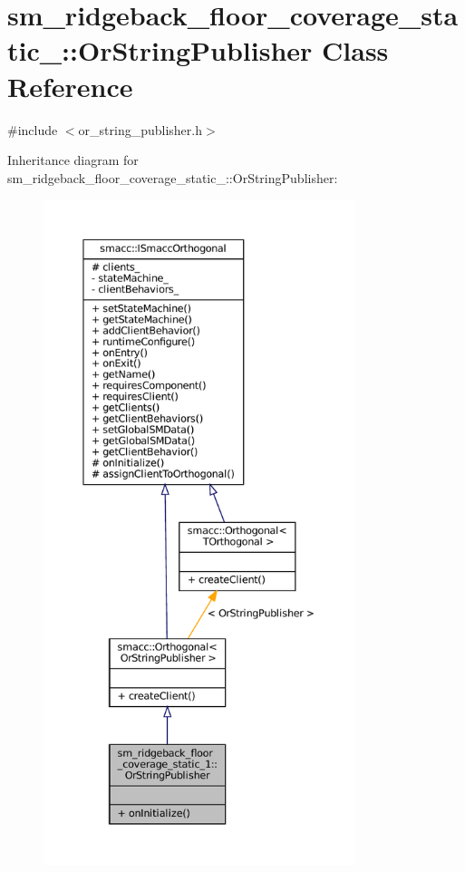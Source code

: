 \hypertarget{classsm__ridgeback__floor__coverage__static__1_1_1OrStringPublisher}{}\section{sm\+\_\+ridgeback\+\_\+floor\+\_\+coverage\+\_\+static\+\_\+:\+:Or\+String\+Publisher Class Reference}
\label{classsm__ridgeback__floor__coverage__static__1_1_1OrStringPublisher}


{\ttfamily \#include $<$or\+\_\+string\+\_\+publisher.\+h$>$}



Inheritance diagram for sm\+\_\+ridgeback\+\_\+floor\+\_\+coverage\+\_\+static\+\_\+:\+:Or\+String\+Publisher\+:
\nopagebreak
\begin{figure}[H]
\begin{center}
\leavevmode
\includegraphics[height=550pt]{classsm__ridgeback__floor__coverage__static__1_1_1OrStringPublisher__inherit__graph}
\end{center}
\end{figure}


